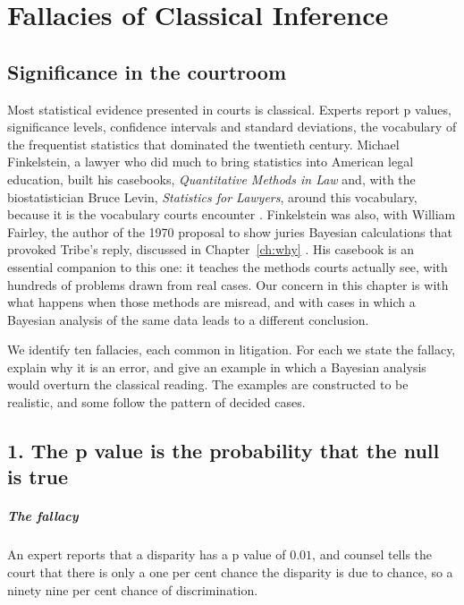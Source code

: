 \chapter{Fallacies of Classical Inference}
\label{ch:fallacies}

\section{Significance in the courtroom}

Most statistical evidence presented in courts is classical. Experts report p values, significance levels, confidence intervals and standard deviations, the vocabulary of the frequentist statistics that dominated the twentieth century. Michael Finkelstein, a lawyer who did much to bring statistics into American legal education, built his casebooks, \emph{Quantitative Methods in Law} and, with the biostatistician Bruce Levin, \emph{Statistics for Lawyers}, around this vocabulary, because it is the vocabulary courts encounter \citep{finkelstein2015}. Finkelstein was also, with William Fairley, the author of the 1970 proposal to show juries Bayesian calculations that provoked Tribe's reply, discussed in Chapter~\ref{ch:why} \citep{finkelstein1970}. His casebook is an essential companion to this one: it teaches the methods courts actually see, with hundreds of problems drawn from real cases. Our concern in this chapter is with what happens when those methods are misread, and with cases in which a Bayesian analysis of the same data leads to a different conclusion.

We identify ten fallacies, each common in litigation. For each we state the fallacy, explain why it is an error, and give an example in which a Bayesian analysis would overturn the classical reading. The examples are constructed to be realistic, and some follow the pattern of decided cases.

\section{1. The p value is the probability that the null is true}

\paragraph{The fallacy} An expert reports that a disparity has a p value of $0.01$, and counsel tells the court that there is only a one per cent chance the disparity is due to chance, so a ninety nine per cent chance of discrimination.

